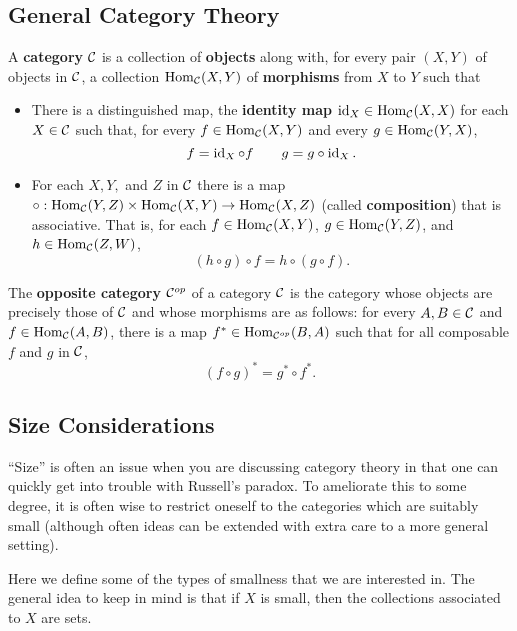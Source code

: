 \documentclass[12pt]{article}
\begin{document}
\subsection{General Category Theory}
\begin{defn}
  A \textbf{category} $\mathcal{C}$ is a collection of \textbf{objects} along with, for every pair $(X,Y)$ of objects in $\mathcal{C}$, a collection $\operatorname{Hom}_{\mathcal{C}}(X,Y)$ of \textbf{morphisms} from $X$ to $Y$ such that
  \begin{itemize}
    \item There is a distinguished map, the \textbf{identity map} $\operatorname{id}_X\in\operatorname{Hom}_{\mathcal{C}}(X,X)$ for each $X\in\mathcal{C}$ such that, for every $f\in\operatorname{Hom}_{\mathcal{C}}(X,Y)$ and every $g\in\operatorname{Hom}_{\mathcal{C}}(Y,X)$,
    \[f=\operatorname{id}_X\circ f\qquad g=g\circ\operatorname{id}_X.\]
    \item For each $X,Y,$ and $Z$ in $\mathcal{C}$ there is a map $\circ:\operatorname{Hom}_{\mathcal{C}}(Y,Z)\times\operatorname{Hom}_{\mathcal{C}}(X,Y)\to\operatorname{Hom}_{\mathcal{C}}(X,Z)$ (called \textbf{composition}) that is associative. That is, for each $f\in\operatorname{Hom}_{\mathcal{C}}(X,Y)$, $g\in\operatorname{Hom}_{\mathcal{C}}(Y,Z)$, and $h\in\operatorname{Hom}_{\mathcal{C}}(Z,W)$,
    \[(h\circ g)\circ f=h\circ(g\circ f).\]
  \end{itemize}
\end{defn}
\begin{defn}
	The \textbf{opposite category} $\mathcal{C}^{op}$ of a category $\mathcal{C}$ is the category whose objects are 
	precisely those of $\mathcal{C}$ and whose morphisms are as follows: for every $A,B\in\mathcal{C}$ and $f\in\operatorname{Hom}_{\mathcal{C}}(A,B)$,
	there is a map $f^\ast\in\operatorname{Hom}_{\mathcal{C}^{op}}(B,A)$ such that for all composable $f$ and $g$ in $\mathcal{C}$,
	\[(f\circ g)^\ast=g^\ast\circ f^\ast.\]
\end{defn}

\subsection{Size Considerations}
``Size'' is often an issue when you are discussing category theory in that one can quickly get into trouble with Russell's paradox.
To ameliorate this to some degree, it is often wise to restrict oneself to the categories which are suitably small (although often 
ideas can be extended with extra care to a more general setting).

Here we define some of the types of smallness that we are interested in. The general idea to keep in mind is that if $X$ is small, then the 
collections associated to $X$ are sets.
\end{document}
